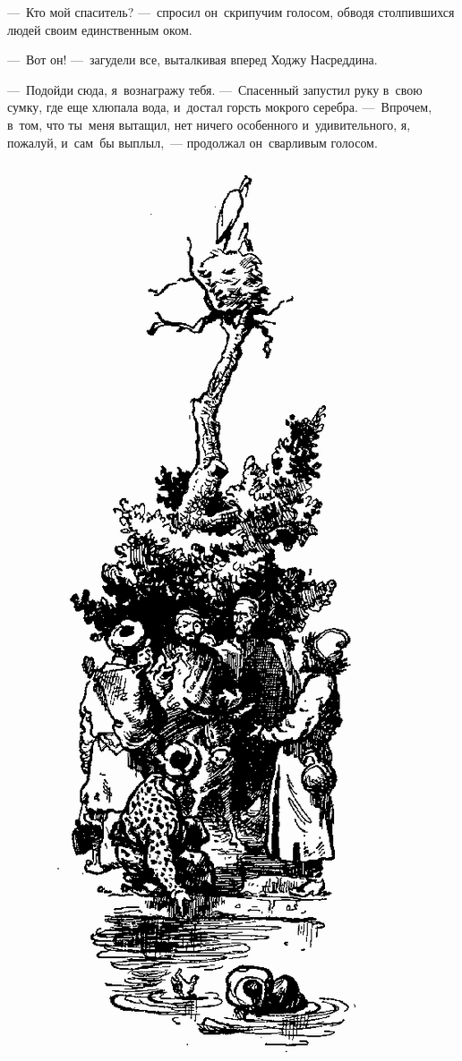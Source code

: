 \documentclass[12pt,a4paper]{book}
\begin{document}
—~Кто мой спаситель? —~спросил он~скрипучим голосом, обводя столпившихся людей своим единственным оком.

—~Вот он! —~загудели все, выталкивая вперед Ходжу Насреддина.

—~Подойди сюда, я~вознагражу тебя. —~Спасенный запустил руку в~свою сумку, где еще хлюпала вода, и~достал горсть мокрого серебра. —~Впрочем, в~том, что ты~меня вытащил, нет ничего особенного и~удивительного, я, пожалуй, и~сам~бы выплыл,~— продолжал он~сварливым голосом.

\begin{figure}[p]
\centering
\includegraphics[scale=0.6]{5.png}
\end{figure}
\end{document}
